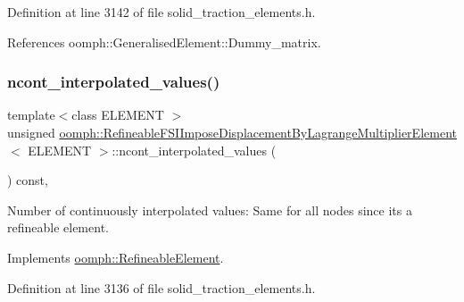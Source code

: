 Definition at line 3142 of file solid\+\_\+traction\+\_\+elements.\+h.



References oomph\+::\+Generalised\+Element\+::\+Dummy\+\_\+matrix.

\mbox{\label{classoomph_1_1RefineableFSIImposeDisplacementByLagrangeMultiplierElement_af0e6193a9a1744d19efd4dfb48234bb0}} 
\subsubsection{\texorpdfstring{ncont\+\_\+interpolated\+\_\+values()}{ncont\_interpolated\_values()}}
{\footnotesize\ttfamily template$<$class E\+L\+E\+M\+E\+NT $>$ \\
unsigned \hyperlink{classoomph_1_1RefineableFSIImposeDisplacementByLagrangeMultiplierElement}{oomph\+::\+Refineable\+F\+S\+I\+Impose\+Displacement\+By\+Lagrange\+Multiplier\+Element}$<$ E\+L\+E\+M\+E\+NT $>$\+::ncont\+\_\+interpolated\+\_\+values (\begin{DoxyParamCaption}{ }\end{DoxyParamCaption}) const\hspace{0.3cm}{\ttfamily [inline]}, {\ttfamily [virtual]}}



Number of continuously interpolated values\+: Same for all nodes since it\textquotesingle{}s a refineable element. 



Implements \hyperlink{classoomph_1_1RefineableElement_a53e171a18c9f43f1db90a6876516a073}{oomph\+::\+Refineable\+Element}.



Definition at line 3136 of file solid\+\_\+traction\+\_\+elements.\+h.

